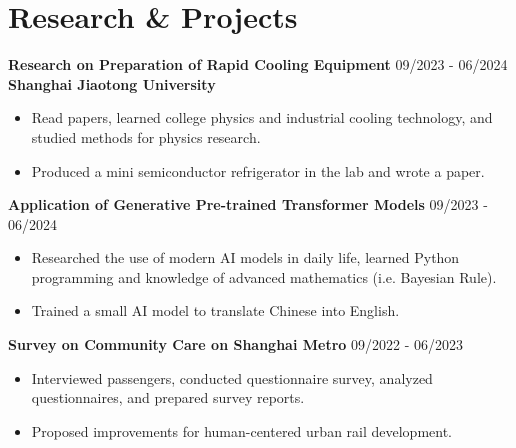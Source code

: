 \documentclass[a4paper,12pt]{article}
\begin{document}


\section{Research \& Projects}
\noindent \textbf{Research on Preparation of Rapid Cooling Equipment} \hfill 09/2023 - 06/2024 \\ \textbf{Shanghai Jiaotong University}
\begin{itemize}
    \item Read papers, learned college physics and industrial cooling technology, and studied methods for physics research.
    \item Produced a mini semiconductor refrigerator in the lab and wrote a paper.
\end{itemize}
\noindent \textbf{Application of Generative Pre-trained Transformer Models} \hfill 09/2023 - 06/2024
\begin{itemize}
    \item Researched the use of modern AI models in daily life, learned Python programming and knowledge of advanced mathematics (i.e. Bayesian Rule).
    \item Trained a small AI model to translate Chinese into English.
\end{itemize}
\noindent \textbf{Survey on Community Care on Shanghai Metro} \hfill 09/2022 - 06/2023
\begin{itemize}
    \item Interviewed passengers, conducted questionnaire survey, analyzed questionnaires, and prepared survey reports.
    \item Proposed improvements for human-centered urban rail development.
\end{itemize}
\end{document}

